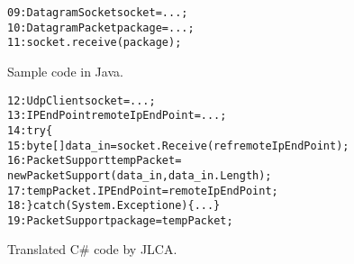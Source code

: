 \begin{figure}[t]
\begin{CodeOut}%
\begin{alltt}
09: DatagramSocket socket = ...;
10: DatagramPacket package = ...;
11: socket.receive(package);
\end{alltt}
\end{CodeOut}\vspace*{-4ex}
\caption{Sample code in Java.}\vspace*{-2ex}
\label{fig:javacode}
\begin{CodeOut}%
\begin{alltt}
12: UdpClient socket = ...;
13: IPEndPoint remoteIpEndPoint = ...;
14: try\{
15:  byte[] data_in = socket.Receive(ref remoteIpEndPoint);
16:  PacketSupport tempPacket =
          new PacketSupport(data_in, data_in.Length);
17:   tempPacket.IPEndPoint = remoteIpEndPoint;
18: \} catch (System.Exception e)\{...\}
19: PacketSupport package = tempPacket;
\end{alltt}
\end{CodeOut}\vspace*{-4ex}
\caption{Translated C\# code by JLCA.}\vspace*{-4ex}
\label{fig:codeJLCA}
\end{figure}




